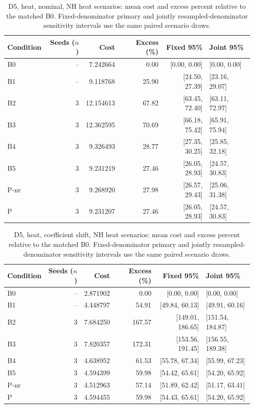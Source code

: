 \begin{table}[ht]
\centering\small
\caption{D5, heat, nominal, NH heat scenarios: mean cost and excess percent relative to the matched B0. Fixed-denominator primary and jointly resampled-denominator sensitivity intervals use the same paired scenario draws.}\label{tab:revision_cost_E5_heat_locked_nominal}
\begin{tabular}{@{}lrrrrl@{}}\toprule
Condition & Seeds ($n$) & Cost & Excess (\%) & Fixed 95\% & Joint 95\%\\\midrule
B0 & -- & 7.242664 & 0.00 & [0.00, 0.00] & [0.00, 0.00]\\
B1 & -- & 9.118768 & 25.90 & [24.50, 27.39] & [23.16, 29.07]\\
B2 & 3 & 12.154613 & 67.82 & [63.45, 72.40] & [63.11, 72.97]\\
B3 & 3 & 12.362595 & 70.69 & [66.18, 75.42] & [65.91, 75.94]\\
B4 & 3 & 9.326493 & 28.77 & [27.35, 30.25] & [25.85, 32.18]\\
B5 & 3 & 9.231219 & 27.46 & [26.05, 28.93] & [24.57, 30.83]\\
P-nr & 3 & 9.268920 & 27.98 & [26.57, 29.43] & [25.06, 31.38]\\
P & 3 & 9.231207 & 27.46 & [26.05, 28.93] & [24.57, 30.83]\\
\bottomrule\end{tabular}
\end{table}

\begin{table}[ht]
\centering\small
\caption{D5, heat, coefficient shift, NH heat scenarios: mean cost and excess percent relative to the matched B0. Fixed-denominator primary and jointly resampled-denominator sensitivity intervals use the same paired scenario draws.}\label{tab:revision_cost_E5_heat_locked_coefficient_ood}
\begin{tabular}{@{}lrrrrl@{}}\toprule
Condition & Seeds ($n$) & Cost & Excess (\%) & Fixed 95\% & Joint 95\%\\\midrule
B0 & -- & 2.871902 & 0.00 & [0.00, 0.00] & [0.00, 0.00]\\
B1 & -- & 4.448797 & 54.91 & [49.84, 60.13] & [49.91, 60.16]\\
B2 & 3 & 7.684250 & 167.57 & [149.01, 186.65] & [151.54, 184.87]\\
B3 & 3 & 7.820357 & 172.31 & [153.56, 191.45] & [156.55, 189.38]\\
B4 & 3 & 4.638952 & 61.53 & [55.78, 67.34] & [55.99, 67.23]\\
B5 & 3 & 4.594399 & 59.98 & [54.42, 65.61] & [54.20, 65.92]\\
P-nr & 3 & 4.512963 & 57.14 & [51.89, 62.42] & [51.17, 63.41]\\
P & 3 & 4.594455 & 59.98 & [54.43, 65.61] & [54.20, 65.92]\\
\bottomrule\end{tabular}
\end{table}

